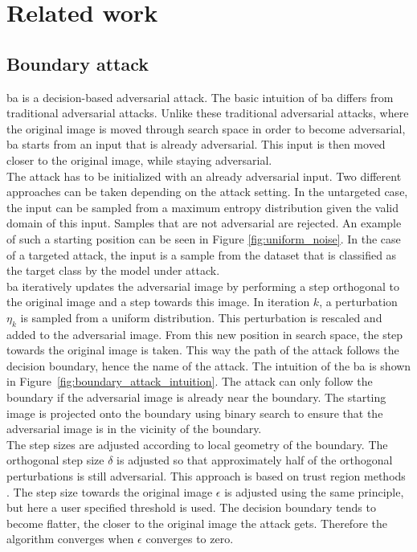 \chapter{Related work}
\section{Boundary attack}
\gls{ba} \cite{boundary_attack} is a decision-based adversarial attack. The basic intuition of \gls{ba} differs from traditional adversarial attacks. Unlike these traditional adversarial attacks, where the original image is moved through search space in order to become adversarial, \gls{ba} starts from an input that is already adversarial. This input is then moved closer to the original image, while staying adversarial.\\

The attack has to be initialized with an already adversarial input. Two different approaches can be taken depending on the attack setting. In the untargeted case, the input can be sampled from a maximum entropy distribution given the valid domain of this input. Samples that are not adversarial are rejected. An example of such a starting position can be seen in Figure \ref{fig:uniform_noise}. In the case of a targeted attack, the input is a sample from the dataset that is classified as the target class by the model under attack.\\

\gls{ba} iteratively updates the adversarial image by performing a step orthogonal to the original image and a step towards this image. In iteration $k$, a perturbation $\eta_k$ is sampled from a uniform distribution. This perturbation is rescaled and added to the adversarial image. From this new position in search space, the step towards the original image is taken. This way the path of the attack follows the decision boundary, hence the name of the attack. The intuition of the \gls{ba} is shown in Figure~\ref{fig:boundary_attack_intuition}. The attack can only follow the boundary if the adversarial image is already near the boundary. The starting image is projected onto the boundary using binary search to ensure that the adversarial image is in the vicinity of the boundary.\\

The step sizes are adjusted according to local geometry of the boundary. The orthogonal step size $\delta$ is adjusted so that approximately half of the orthogonal perturbations is still adversarial. This approach is based on trust region methods \cite{trm}. The step size towards the original image $\epsilon$ is adjusted using the same principle, but here a user specified threshold is used. The decision boundary tends to become flatter, the closer to the original image the attack gets. Therefore the algorithm converges when $\epsilon$ converges to zero.\\

